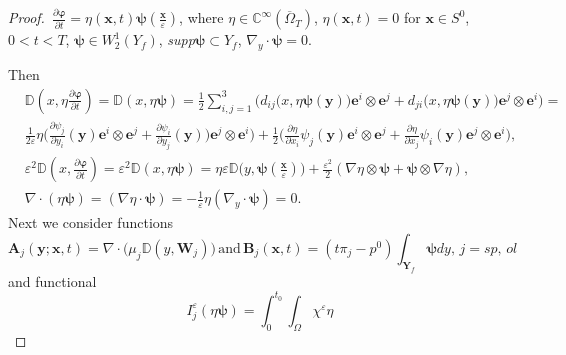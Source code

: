 \documentclass[10pt,a4paper]{amsart}
\begin{document}
\begin{proof}
$\displaystyle\,\frac{\partial\boldsymbol{\varphi}}{\partial{t}}=
\eta(\boldsymbol{x},t)\boldsymbol{\psi}(\frac{\boldsymbol{x}}{\varepsilon})$, where
$\eta\in\mathbb{C}^{\infty}(\overline{\Omega}_{T})$, $\eta(\boldsymbol{x},t)=0$ for $\boldsymbol{x}\in{S}^{0}$, $0<t<T$, $\boldsymbol{\psi}\in{W}^{1}_{2}(Y_{f})$,
\emph{supp}$\boldsymbol{\psi}\subset{Y}_{f}$, $\nabla_{y}\cdot\boldsymbol{\psi}=0$.

Then
\begin{equation*}
\begin{aligned}
& 
\mathbb{D}(x,{\eta}\frac{\partial\boldsymbol{\varphi}}{\partial{t}})=
\mathbb{D}(x,{\eta}\boldsymbol{\psi})=\frac{1}{2}\sum_{i,j=1}^{3}\Big({d}_{ij}\big(x,{\eta}
\boldsymbol{\psi}(\boldsymbol{y})\big)\boldsymbol{e}^{i}\otimes\boldsymbol{e}^{j}+
{d}_{ji}(x,{\eta}\boldsymbol{\psi}(\boldsymbol{y})\big)\boldsymbol{e}^{j}\otimes\boldsymbol{e}^{i}\Big)=
\\
& \frac{1}{2\varepsilon}{\eta}\big(\frac{\partial{\psi}_{j}}{\partial{y}_{i}}(\boldsymbol{y})
\boldsymbol{e}^{i}\otimes\boldsymbol{e}^{j}+\frac{\partial{\psi}_{i}}{\partial{y}_{j}}(\boldsymbol{y})\big)
\boldsymbol{e}^{j}\otimes\boldsymbol{e}^{i}\big)+
\frac{1}{2}\big(\frac{\partial{\eta}}{\partial{x}_{i}}{\psi}_{j}(\boldsymbol{y})
\boldsymbol{e}^{i}\otimes\boldsymbol{e}^{j}+
\frac{\partial{\eta}}{\partial{x}_{j}}{\psi}_{i}(\boldsymbol{y})
\boldsymbol{e}^{j}\otimes\boldsymbol{e}^{i}\big),
\\
& \varepsilon^{2}\mathbb{D}(x,\frac{\partial\boldsymbol{\varphi}}{\partial{t}})=
\varepsilon^{2}\mathbb{D}(x,{\eta}\boldsymbol{\psi})=
\eta\varepsilon\mathbb{D}\big(y,\boldsymbol{\psi}(\frac{\boldsymbol{x}}{\varepsilon})\big)+
\frac{\varepsilon^{2}}{2}(\nabla{\eta}\otimes\boldsymbol{\psi}+
\boldsymbol{\psi}\otimes\nabla{\eta}),
\\
& \nabla\cdot(\eta\boldsymbol{\psi})=
(\nabla{\eta}\cdot\boldsymbol{\psi})=-\frac{1}{\varepsilon}\eta(\nabla_{y}\cdot\boldsymbol{\psi})=0.
\end{aligned}
\end{equation*}
Next we consider functions
\begin{equation}\label{eq5.9}
\boldsymbol{A}_{j}(\boldsymbol{y};\boldsymbol{x},t)=
\nabla\cdot\big(\mu_{j}\mathbb{D}(y,\boldsymbol{W}_{j})\big)\,
\mbox{and}\,\boldsymbol{B}_{j}(\boldsymbol{x},t)=
(t\pi_{j}-{p}^{0})\int_{\textbf{Y}_{f}}\boldsymbol{\psi}dy,\,j=sp,\,ol
\end{equation}
and functional
\begin{equation*}
I^{\varepsilon}_{j}(\eta\boldsymbol{\psi})=\int_{0}^{t_{0}}\int_{\Omega}\chi^{\varepsilon}\eta

\end{equation*}
\end{proof}
\end{document}
